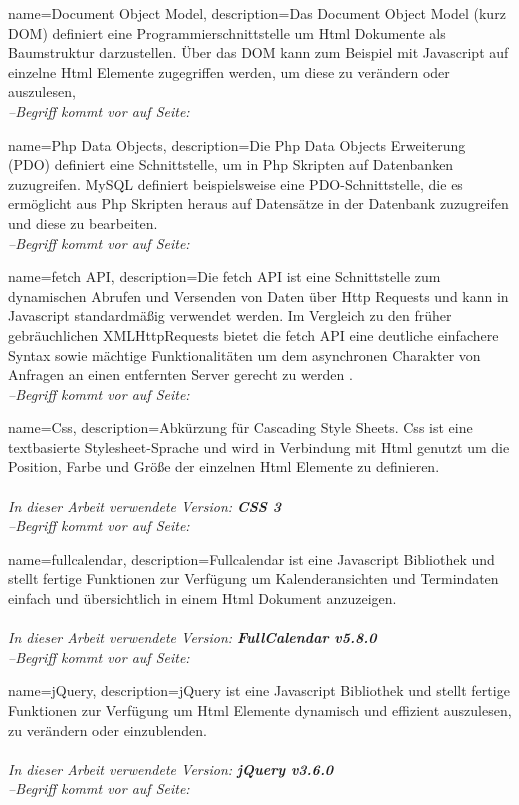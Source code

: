 {
    name=Document Object Model,
    description={Das Document Object Model (kurz DOM) definiert eine Programmierschnittstelle um \gls{Html} Dokumente als Baumstruktur darzustellen. Über das DOM kann zum Beispiel mit \gls{Javascript} auf einzelne Html Elemente zugegriffen werden, um diese zu verändern oder auszulesen,}
    \\\textit{--Begriff kommt vor auf Seite: }
}

{
    name=Php Data Objects,
    description={Die Php Data Objects Erweiterung (PDO) definiert eine Schnittstelle, um in \gls{Php} Skripten auf Datenbanken zuzugreifen. \gls{MySQL} definiert beispielsweise eine PDO-Schnittstelle, die es ermöglicht aus Php Skripten heraus auf Datensätze in der Datenbank zuzugreifen und diese zu bearbeiten.}
    \\\textit{--Begriff kommt vor auf Seite: }
}

{
    name=fetch API,
    description={Die fetch API ist eine Schnittstelle zum dynamischen Abrufen und Versenden von Daten über \gls{Http} Requests und kann in \gls{Javascript} standardmäßig verwendet werden. Im Vergleich zu den früher gebräuchlichen XMLHttpRequests bietet die fetch API eine deutliche einfachere Syntax sowie mächtige Funktionalitäten um dem asynchronen Charakter von Anfragen an einen entfernten Server gerecht zu werden
             \cite{fetchAPI}.}
    \\\textit{--Begriff kommt vor auf Seite: }
}

{
    name=Css,
    description={Abkürzung für Cascading Style Sheets. Css ist eine textbasierte Stylesheet-Sprache und wird in Verbindung mit \gls{Html} genutzt um die Position, Farbe und Größe der einzelnen Html Elemente zu definieren.\\ \\
            \textit{In dieser Arbeit verwendete Version: \textbf{CSS 3}}
             \cite{Css}}
    \\\textit{--Begriff kommt vor auf Seite: }
}

{
    name=fullcalendar,
    description={Fullcalendar ist eine \gls{Javascript} Bibliothek und stellt fertige Funktionen zur Verfügung um Kalenderansichten und Termindaten einfach und übersichtlich in einem \gls{Html} Dokument anzuzeigen.\\ \\
            \textit{In dieser Arbeit verwendete Version: \textbf{FullCalendar v5.8.0}}
             \cite{fullCalendarWeb}}
    \\\textit{--Begriff kommt vor auf Seite: }
}

{
    name=jQuery,
    description={jQuery ist eine \gls{Javascript} Bibliothek und stellt fertige Funktionen zur Verfügung um \gls{Html} Elemente dynamisch und effizient auszulesen, zu verändern oder einzublenden.\\ \\
            \textit{In dieser Arbeit verwendete Version: \textbf{jQuery v3.6.0}}
             \cite{jQuery}}
    \\\textit{--Begriff kommt vor auf Seite: }
}